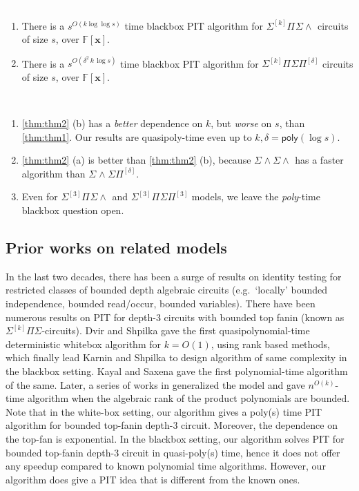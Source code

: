 \documentclass[10pt,a4paper]{article}
\newcommand{\poly}{\mathsf{poly}}
\newcommand{\F}{\mathbb{F}}
\newcommand{\x}{{\boldsymbol x}}
\newcommand{\SPSP}[3]{\Sigma^{#1}\Pi^{#2}\Sigma\Pi^{#3}}
\newcommand{\SWSP}[3]{\Sigma^{#1}\!\wedge^{#2}\!\Sigma\Pi^{#3}}
\newcommand{\SPSU}[3]{\Sigma^{#1} \Pi^{#2} \Sigma \wedge^{#3}}
\newcommand{\SWSU}[2]{\Sigma^{#1}\!\wedge\!\Sigma\!\wedge^{#2}}
\numberwithin{equation}{section}
\begin{document}
\begin{theorem}\label{thm:thm2}
    \textcolor{white}{.}
    \begin{enumerate}[label={(\alph*)}]
        \item There is a $s^{O(k \log \log s)}$ time blackbox PIT algorithm for $\SPSU{[k]}{}{}$ circuits of size $s$, over $\F[\x]$.
        \item There is a $s^{O(\delta^2\,k\,\log s)}$ time blackbox PIT algorithm for $\SPSP{[k]}{}{[\delta]}$ circuits of size $s$, over $\F[\x]$.
    \end{enumerate}
\end{theorem}


\begin{remark*} ~ 
    \begin{enumerate}
    \setlength\itemsep{.1em}
        \item \autoref{thm:thm2} (b) has a \emph{better} dependence on $k$, but \emph{worse} on $s$, than \autoref{thm:thm1}. Our results are quasipoly-time even up to $k,\delta = \poly(\log s)$.
        \item \autoref{thm:thm2} (a) is better than \autoref{thm:thm2} (b), because $\SWSU{}{}{}$ has a faster algorithm than $\SWSP{}{}{[\delta]}$. 
%
        \item Even for $\SPSU{[3]}{}{}$ and $\SPSP{[3]}{}{[3]}$ models, we leave the {\em poly}-time blackbox question open. 
    \end{enumerate}
\end{remark*}

\subsection{Prior works on related models}  

In the last two decades, there has been a surge of results on identity testing for restricted
classes of bounded depth algebraic circuits (e.g.~`locally' bounded independence, bounded read/occur, bounded variables). There have been numerous results on PIT for depth-3 circuits with bounded
top fanin (known as $\Sigma^{[k]}\Pi\Sigma$-circuits). Dvir and Shpilka \cite{dvir2007locally} gave the first quasipolynomial-time deterministic whitebox algorithm for $k=O(1)$, using rank based methods, which finally lead Karnin and Shpilka \cite{karnin2011black} to design algorithm of same complexity in the blackbox setting. Kayal and Saxena \cite{kayal2007polynomial} gave the first polynomial-time algorithm of the same. Later, a series of works 
in \cite{saxena2011almost,saxena2012blackbox,saxena2013sylvester, agrawal2016jacobian} generalized the model and gave $n^{O(k)}$-time algorithm when the algebraic rank of the product polynomials are bounded. Note that in the white-box setting, our algorithm gives a poly(s) time PIT algorithm for bounded top-fanin depth-3 circuit. Moreover, the dependence on the top-fan is exponential. In the blackbox setting, our algorithm solves PIT for bounded top-fanin depth-3 circuit in quasi-poly(s) time, hence it does not offer any speedup compared to known polynomial time algorithms. However, our algorithm does give a PIT idea that is different from the known ones.
\end{document}
